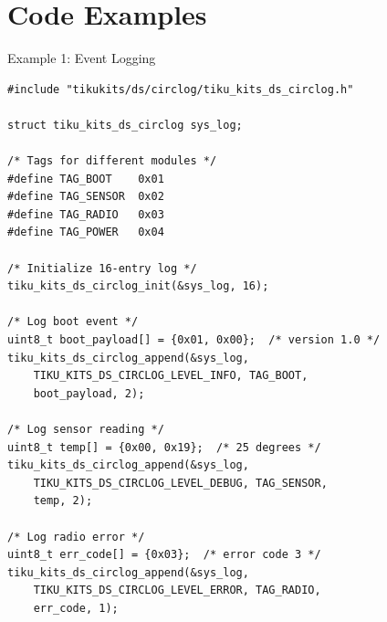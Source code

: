 \documentclass[aspectratio=169, 10pt]{beamer}
\begin{document}
\section{Code Examples}

\begin{frame}[fragile]{Example 1: Event Logging}
\begin{lstlisting}[style=cstyle,
  title={Record system events with timestamps and severity}]
#include "tikukits/ds/circlog/tiku_kits_ds_circlog.h"

struct tiku_kits_ds_circlog sys_log;

/* Tags for different modules */
#define TAG_BOOT    0x01
#define TAG_SENSOR  0x02
#define TAG_RADIO   0x03
#define TAG_POWER   0x04

/* Initialize 16-entry log */
tiku_kits_ds_circlog_init(&sys_log, 16);

/* Log boot event */
uint8_t boot_payload[] = {0x01, 0x00};  /* version 1.0 */
tiku_kits_ds_circlog_append(&sys_log,
    TIKU_KITS_DS_CIRCLOG_LEVEL_INFO, TAG_BOOT,
    boot_payload, 2);

/* Log sensor reading */
uint8_t temp[] = {0x00, 0x19};  /* 25 degrees */
tiku_kits_ds_circlog_append(&sys_log,
    TIKU_KITS_DS_CIRCLOG_LEVEL_DEBUG, TAG_SENSOR,
    temp, 2);

/* Log radio error */
uint8_t err_code[] = {0x03};  /* error code 3 */
tiku_kits_ds_circlog_append(&sys_log,
    TIKU_KITS_DS_CIRCLOG_LEVEL_ERROR, TAG_RADIO,
    err_code, 1);
\end{lstlisting}
\end{frame}
\end{document}
